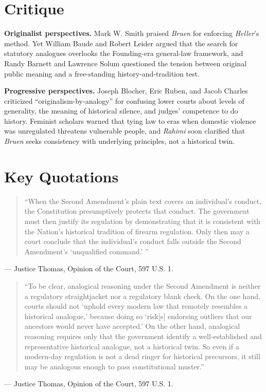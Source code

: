 \documentclass[12pt]{article}
\begin{document}
\section{Critique}

\textbf{Originalist perspectives.} Mark W. Smith praised \textit{Bruen} for enforcing \textit{Heller}'s method. Yet William Baude and Robert Leider argued that the search for statutory analogues overlooks the Founding-era general-law framework, and Randy Barnett and Lawrence Solum questioned the tension between original public meaning and a free-standing history-and-tradition test.

\textbf{Progressive perspectives.} Joseph Blocher, Eric Ruben, and Jacob Charles criticized ``originalism-by-analogy'' for confusing lower courts about levels of generality, the meaning of historical silence, and judges' competence to do history. Feminist scholars warned that tying law to eras when domestic violence was unregulated threatens vulnerable people, and \textit{Rahimi} soon clarified that \textit{Bruen} seeks consistency with underlying principles, not a historical twin.

\section{Key Quotations}

\begin{quote}
``When the Second Amendment's plain text covers an individual's conduct, the Constitution presumptively protects that conduct. The government must then justify its regulation by demonstrating that it is consistent with the Nation's historical tradition of firearm regulation. Only then may a court conclude that the individual's conduct falls outside the Second Amendment's `unqualified command.' ''
\end{quote}
\noindent --- Justice Thomas, Opinion of the Court, 597 U.S. 1.

\begin{quote}
``To be clear, analogical reasoning under the Second Amendment is neither a regulatory straightjacket nor a regulatory blank check. On the one hand, courts should not `uphold every modern law that remotely resembles a historical analogue,' because doing so `risk[s] endorsing outliers that our ancestors would never have accepted.' On the other hand, analogical reasoning requires only that the government identify a well-established and representative historical analogue, not a historical twin. So even if a modern-day regulation is not a dead ringer for historical precursors, it still may be analogous enough to pass constitutional muster.''
\end{quote}
\noindent --- Justice Thomas, Opinion of the Court, 597 U.S. 1.
\end{document}
